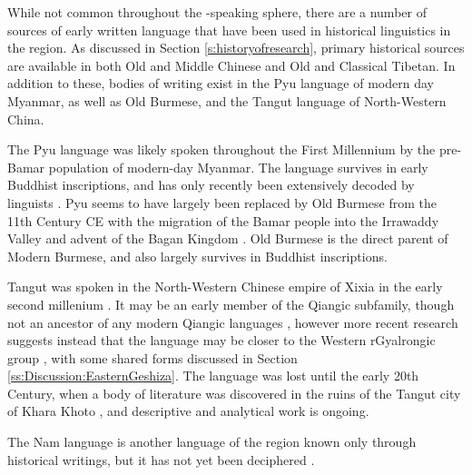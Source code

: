While not common throughout the \lfam-speaking sphere, there are a number of sources of early written language that have been used in historical linguistics in the region. As discussed in Section \ref{s:historyofresearch}, primary historical sources are available in both Old and Middle Chinese and Old and Classical Tibetan. In addition to these, bodies of writing exist in the Pyu language of modern day Myanmar, as well as Old Burmese, and the Tangut language of North-Western China.

The Pyu language was likely spoken throughout the First Millennium  by the pre-Bamar population of modern-day Myanmar. The language survives in early Buddhist inscriptions, and has only recently been extensively decoded by linguists \cites{Griffiths2017}{Miyake2019}. Pyu seems to have largely been replaced by Old Burmese from the 11th Century CE with the migration of the Bamar people into the Irrawaddy Valley and advent of the Bagan Kingdom \cites{Wheatley2017}{Griffiths2017}. Old Burmese is the direct parent of Modern Burmese, and also largely survives in Buddhist inscriptions.

Tangut was spoken in the North-Western Chinese empire of Xixia in the early second millenium \cite{Gong2017}. It may be an early member of the Qiangic subfamily, though not an ancestor of any modern Qiangic languages \cite{Matisoff2004}, however more recent research suggests instead that the language may be closer to the Western rGyalrongic group \cite{Lai2020}, with some shared forms discussed in Section \ref{ss:Discussion:EasternGeshiza}. The language was lost until the early 20th Century, when a body of literature was discovered in the ruins of the Tangut city of Khara Khoto \cite{Gong2017}, and descriptive and analytical work is ongoing.

The Nam language is another language of the region known only through historical writings, but it has not yet been deciphered \cite{Ikeda2012}.

